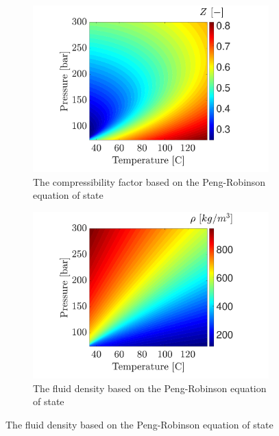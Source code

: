 \documentclass[../Article_Model_Parameters.tex]{subfiles}
\begin{document}
		\begin{figure}[H]
			\begin{subfigure}[b]{0.95\textwidth}
				\centering
				\includegraphics[trim = 2.9cm 7cm 3cm 7cm,clip,width=\textwidth]{Figures/Compressibility.pdf}	
				\caption{The compressibility factor based on the Peng-Robinson equation of state}
                \label{fig: SFE_Properties_Compressibility}
			\end{subfigure}
			\hfill
			\begin{subfigure}[b]{0.95\textwidth}
				\centering
				\includegraphics[trim = 2.9cm 7cm 3cm 7cm,clip,width=\textwidth]{Figures/RHO.pdf}	
				\caption{The fluid density based on the Peng-Robinson equation of state}
                \label{fig: SFE_Properties_Density}
			\end{subfigure}

\end{figure}
\end{document}
